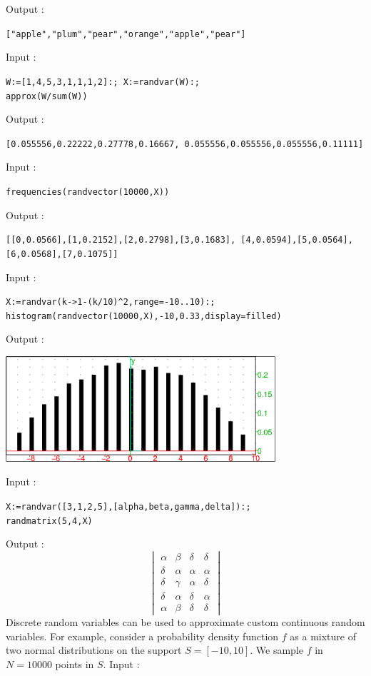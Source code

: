 Output :
\begin{center}
  \tt ["apple","plum","pear","orange","apple","pear"]
\end{center}
Input :
\begin{center}
  \tt W:=[1,4,5,3,1,1,1,2]:; X:=randvar(W):;\\approx(W/sum(W))
\end{center}
Output :
\begin{center}
  \tt [0.055556,0.22222,0.27778,0.16667, 0.055556,0.055556,0.055556,0.11111]
\end{center}
Input :
\begin{center}
  \tt frequencies(randvector(10000,X))
\end{center}
Output :
\begin{center}
  \tt [[0,0.0566],[1,0.2152],[2,0.2798],[3,0.1683], [4,0.0594],[5,0.0564],[6,0.0568],[7,0.1075]]
\end{center}
Input :
\begin{center}
  \tt X:=randvar(k->1-(k/10)\verb|^|2,range=-10..10):;\\histogram(randvector(10000,X),-10,0.33,display=filled)
\end{center}
Output :
\begin{center}
  \includegraphics[width=0.75\textwidth]{random_hist1.png}
\end{center}
Input :
\begin{center}
  \tt X:=randvar([3,1,2,5],[alpha,beta,gamma,delta]):;\\randmatrix(5,4,X)
\end{center}
Output :
\[ \begin{vmatrix}\alpha&\beta&\delta&\delta\\ \delta&\alpha&\alpha&\alpha\\ \delta&\gamma&\alpha&\delta\\
\delta&\alpha&\delta&\alpha\\ \alpha&\beta&\delta&\delta\end{vmatrix}\]
Discrete random variables can be used to approximate custom continuous random variables. For example, consider a probability density function $f$ as a mixture of two normal distributions on the support $S=[-10,10]$. We sample $f$ in $N=10000$ points in $S$. Input :

